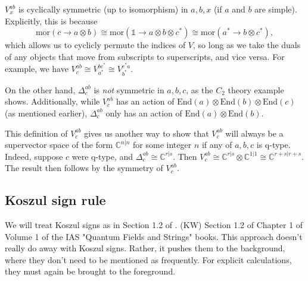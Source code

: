 \documentclass[12pt,a4paper]{article}
\newcounter{arrow}
\newcommand{\tp}{\otimes}
\newcommand{\ra}{\rightarrow}
\newcommand{\unit}{\mathds{1}}
\newcommand{\cc}{\mathbb{C}}
\newcommand\be            {\begin{equation}}
\newcommand\ee            {\end{equation}}
\newcommand{\mor}{\text{mor}}
\newcommand{\End}{\text{End}}
\newcommand{\kw}[1]{{\color{kwcolor}\footnotesize{(KW) #1}}}
\begin{document}
$V^{ab}_x$ is cyclically symmetric (up to isomorphism) in $a,b,x$ (if $a$ and $b$ are simple).
Explicitly, this is because 
\be \mor(c \ra a\tp b) \cong \mor(\unit \ra a\tp b \tp c^*) \cong \mor(a^* \ra b\tp c^*),\ee 
which allows us to cyclicly permute the indices of $V$, so long as we take the duals of any objects that move from subscripts to superscripts, and vice versa. 
For example, we have $V^{ab}_c \cong V^{bc^*}_{a^*} \cong V^{c^*a}_{b^*}$. 

On the other hand, $\Delta^{ab}_c$ is {\it not} symmetric in $a,b,c$, as the $C_2$ theory example shows. 
Additionally, while $V^{ab}_c$ has an action of $\End(a)\otimes\End(b)\otimes\End(c)$ (as mentioned earlier), $\Delta^{ab}_c$
only has an action of $\End(a)\otimes\End(b)$.

This definition of $V^{ab}_c$ gives us another way to show that $V^{ab}_c$ will always be a supervector space of the form $\cc^{n|n}$ for some integer $n$ if any of $a,b,c$ is q-type. 
Indeed, suppose $c$ were q-type, and $\Delta^{ab}_c \cong \cc^{r|s}$. 
Then $V^{ab}_c \cong \cc^{r|s} \tp \cc^{1|1} \cong \cc^{r+s|r+s}$. 
The result then follows by the symmetry of $V^{ab}_c$. 




\subsection{Koszul sign rule} \label{koszul_signs}

We will treat Koszul signs as in Section 1.2 of \cite{xxxx}.
\kw{Section 1.2 of Chapter 1 of Volume 1 of the IAS "Quantum Fields and Strings" books.}
This approach doesn't really do away with Koszul signs.
Rather, it pushes them to the background, where they don't need to be mentioned as frequently.
For explicit calculations, they must again be brought to the foreground.
\end{document}
